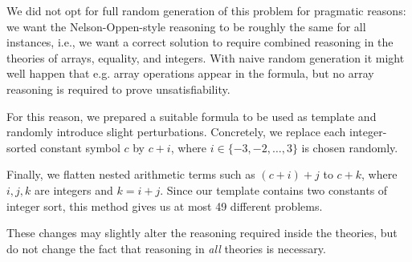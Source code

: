 We did not opt for full random generation of this problem
for pragmatic reasons:
we want the Nelson-Oppen-style reasoning to be roughly the same for all instances,
i.e., we want a correct solution to require combined reasoning
in the theories of arrays, equality, and integers.
With naive random generation it might well happen that e.g. array operations appear in the formula,
but no array reasoning is required to prove unsatisfiability.

For this reason, we prepared a suitable formula to be used as template
and randomly introduce slight perturbations.
Concretely, we replace each integer-sorted constant symbol $c$ by $c+i$,
where $i \in \{-3,-2,\dots,3\}$ is chosen randomly.

Finally, we flatten nested arithmetic terms such as $(c+i)+j$ to $c+k$,
where $i,j,k$ are integers and $k = i+j$.
Since our template contains two constants of integer sort,
this method gives us at most 49 different problems.

These changes may slightly alter the reasoning required inside the
theories, but do not change the fact that reasoning in \emph{all} theories
is necessary.
